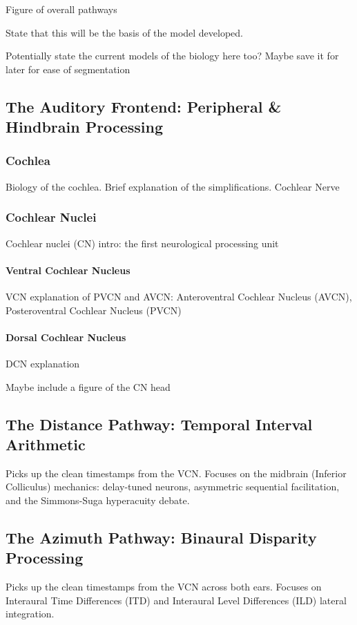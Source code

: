 Figure of overall pathways

State that this will be the basis of the model developed.

Potentially state the current models of the biology here too? Maybe save it for later for ease of segmentation

\subsection{The Auditory Frontend: Peripheral \& Hindbrain Processing}

\subsubsection{Cochlea}

Biology of the cochlea. Brief explanation of the simplifications. Cochlear Nerve

\subsubsection{Cochlear Nuclei}

Cochlear nuclei (CN) intro: the first neurological processing unit

\paragraph{Ventral Cochlear Nucleus}

VCN explanation of PVCN and AVCN: Anteroventral Cochlear Nucleus (AVCN), Posteroventral Cochlear Nucleus (PVCN)

\paragraph{Dorsal Cochlear Nucleus}

DCN explanation

Maybe include a figure of the CN head


\subsection{The Distance Pathway: Temporal Interval Arithmetic}
\label{sec:distance_pathway}
Picks up the clean timestamps from the VCN. Focuses on the midbrain (Inferior Colliculus) mechanics: delay-tuned neurons, asymmetric sequential facilitation, and the Simmons-Suga hyperacuity debate.


\subsection{The Azimuth Pathway: Binaural Disparity Processing}
\label{sec:azimuth_pathway}
Picks up the clean timestamps from the VCN across both ears. Focuses on Interaural Time Differences (ITD) and Interaural Level Differences (ILD) lateral integration.

